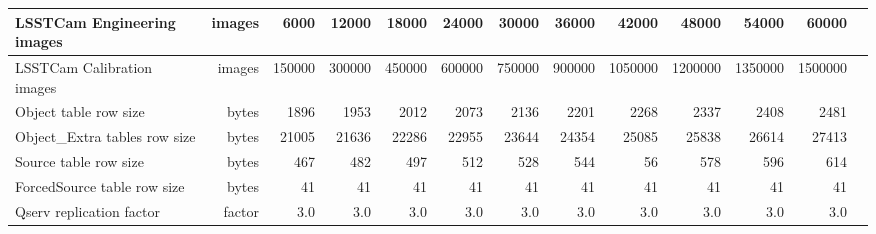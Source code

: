 \begin{longtable} { |p{}  |r  |r  |r  |r  |r  |r  |r  |r  |r  |r  |r  |r |}
{LSSTCam Engineering images}&{images}&{6000}&{12000}&{18000}&{24000}&{30000}&{36000}&{42000}&{48000}&{54000}&{60000} \\ \hline
{LSSTCam Calibration images}&{images}&{150000}&{300000}&{450000}&{600000}&{750000}&{900000}&{1050000}&{1200000}&{1350000}&{1500000} \\ \hline
{Object table row size}&{bytes}&{1896}&{1953}&{2012}&{2073}&{2136}&{2201}&{2268}&{2337}&{2408}&{2481} \\ \hline
{Object\_Extra tables row size}&{bytes}&{21005}&{21636}&{22286}&{22955}&{23644}&{24354}&{25085}&{25838}&{26614}&{27413} \\ \hline
{Source table row size}&{bytes}&{467}&{482}&{497}&{512}&{528}&{544}&{56}&{578}&{596}&{614} \\ \hline
{ForcedSource table row size}&{bytes}&{41}&{41}&{41}&{41}&{41}&{41}&{41}&{41}&{41}&{41} \\ \hline
{Qserv replication factor}&{factor}&{3.0}&{3.0}&{3.0}&{3.0}&{3.0}&{3.0}&{3.0}&{3.0}&{3.0}&{3.0} \\ \hline
\end{longtable} \normalsize

